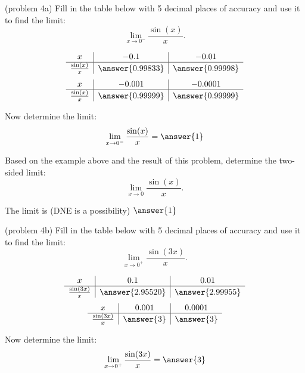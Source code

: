 \documentclass[handout]{ximera}
\begin{document}
\begin{problem}(problem 4a)
Fill in the table below with 5 decimal places of accuracy and use it to find the limit:
\[\lim_{x \to 0^-} \frac{\sin(x)}{x}.\]

\begin{prompt}
\begin{center}
\[
\begin{array}{ c | c | c }
  x & -0.1 & -0.01   \\ 
	\hline 
	 \frac{\sin(x)}{x} & \answer{0.99833} & \answer{0.99998} 
\end{array}
\]
\[
\begin{array}{ c | c | c  }
  x  & -0.001 & -0.0001 \\ 
	\hline 
	 \frac{\sin(x)}{x}  & \answer{0.99999} & \answer{0.99999}
\end{array}
\]
\end{center}
Now determine the limit:
\[
\lim_{x \to 0^-} \frac{\sin(x)}{x} = \answer{1}
\]
\end{prompt}

Based on the example above and the result of this problem, determine the two-sided limit:
\[
\lim_{x \to 0} \frac{\sin(x)}{x}.
\]

The limit is (DNE is a possibility) $\answer{1}$
\end{problem}



\begin{problem}(problem 4b)
Fill in the table below with 5 decimal places of accuracy and use it to find the limit:
\[\lim_{x \to 0^+} \frac{\sin(3x)}{x}.\]

\begin{prompt}
\begin{center}
\[
\begin{array}{ c | c | c }
  x & 0.1 & 0.01   \\ 
	\hline 
	 \frac{\sin(3x)}{x} & \answer{2.95520} & \answer{2.99955} 
\end{array}
\]
\[
\begin{array}{ c | c | c  }
  x  & 0.001 & 0.0001 \\ 
	\hline 
	 \frac{\sin(3x)}{x}  & \answer{3} & \answer{3}
\end{array}
\]
\end{center}
Now determine the limit:
\[
\lim_{x \to 0^+} \frac{\sin(3x)}{x} = \answer{3}
\]
\end{prompt}
\end{problem}
\end{document}
